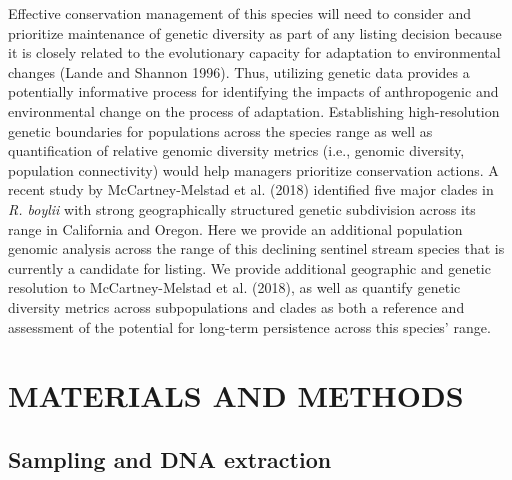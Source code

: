 \documentclass[twoside,12pt,final]{ucthesis-CA2012} %
\begin{document}
\begin{ucmainmatter}
Effective conservation management of this species will need to consider
and prioritize maintenance of genetic diversity as part of any listing
decision because it is closely related to the evolutionary capacity for
adaptation to environmental changes (Lande and Shannon 1996). Thus,
utilizing genetic data provides a potentially informative process for
identifying the impacts of anthropogenic and environmental change on the
process of adaptation. Establishing high-resolution genetic boundaries
for populations across the species range as well as quantification of
relative genomic diversity metrics (i.e., genomic diversity, population
connectivity) would help managers prioritize conservation actions. A
recent study by McCartney-Melstad et al. (2018) identified five major
clades in \emph{R. boylii} with strong geographically structured genetic
subdivision across its range in California and Oregon. Here we provide
an additional population genomic analysis across the range of this
declining sentinel stream species that is currently a candidate for
listing. We provide additional geographic and genetic resolution to
McCartney-Melstad et al. (2018), as well as quantify genetic diversity
metrics across subpopulations and clades as both a reference and
assessment of the potential for long-term persistence across this
species' range.

\hypertarget{materials-and-methods-1}{%
\section{MATERIALS AND METHODS}\label{materials-and-methods-1}}

\hypertarget{sampling-and-dna-extraction-1}{%
\subsection{Sampling and DNA
extraction}\label{sampling-and-dna-extraction-1}}


\end{ucmainmatter}
\end{document}
